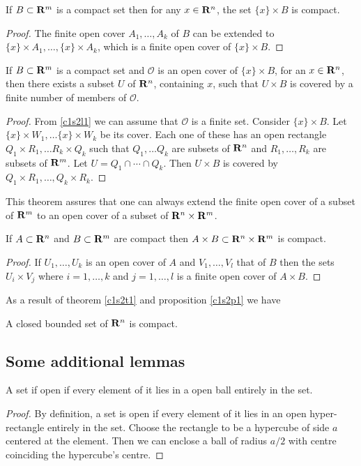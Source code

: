 \begin{lem}\label{c1s2l2}
If $B \subset \mathbf{R}^m$ is a compact set then for any $x \in \mathbf{R}^n$, the set
$\{x\} \times B$ is compact.
\end{lem}
\begin{proof}
The finite open cover $A_1, \ldots, A_k$ of $B$ can be extended to $\{x\} \times
A_1, \ldots, \{x\} \times A_k$, which is a finite open cover of $\{x\}\times B$.
\end{proof}

\begin{thm}\label{c1s2t2}
If $B \subset \mathbf{R}^m$ is a compact set and $\mathcal{O}$ is an open cover of
$\{x\} \times B$, for an $x \in \mathbf{R}^n$, then there exists a subset $U$ of
$\mathbf{R}^n$, containing $x$, such that $U \times B$ is covered by a finite number
of members of $\mathcal{O}$.
\end{thm}
\begin{proof}
From \eqref{c1s2l1} we can assume that $\mathcal{O}$ is a finite set. Consider
$\{x\} \times B$. Let $\{x\} \times W_1, \ldots \{x\} \times W_k$ be its cover.
Each one of these has an open rectangle $Q_1 \times R_1, \ldots R_k \times Q_k$
such that $Q_1, \ldots Q_k$ are subsets of $\mathbf{R}^n$ and $R_1, \ldots, R_k$ are
subsets of $\mathbf{R}^m$. Let $U = Q_1 \cap \cdots \cap Q_k$. Then $U \times B$ is
covered by $Q_1 \times R_1, \ldots, Q_k \times R_k$.
\end{proof}

This theorem assures that one can always extend the finite open cover of a 
subset of $\mathbf{R}^m$ to an open cover of a subset of $\mathbf{R}^n \times \mathbf{R}^m$.

\begin{prop}\label{c1s2p1}
If $A \subset \mathbf{R}^n$ and $B \subset \mathbf{R}^m$ are compact then $A \times B 
\subset \mathbf{R}^n \times \mathbf{R}^m$ is compact.
\end{prop}
\begin{proof}
If $U_1, \ldots, U_k$ is an open cover of $A$ and $V_1, \ldots, V_l$ that of
$B$ then the sets $U_i \times V_j$ where $i = 1, \ldots, k$ and $j = 1, \ldots,
l$ is a finite open cover of $A \times B$.
\end{proof}

As a result of theorem \ref{c1s2t1} and proposition \ref{c1s2p1} we have
\begin{lem}\label{c1s2l3}
A closed bounded set of $\mathbf{R}^n$ is compact.
\end{lem}

\subsection{Some additional lemmas}
\begin{lem}\label{c1s2l4}
A set if open if every element of it lies in a open ball entirely in the set.
\end{lem}
\begin{proof}
By definition, a set is open if every element of it lies in an open hyper-
rectangle entirely in the set. Choose the rectangle to be a hypercube of side 
$a$ centered at the element. Then we can enclose a ball of radius $a/2$ with 
centre coinciding the hypercube's centre.
\end{proof}


